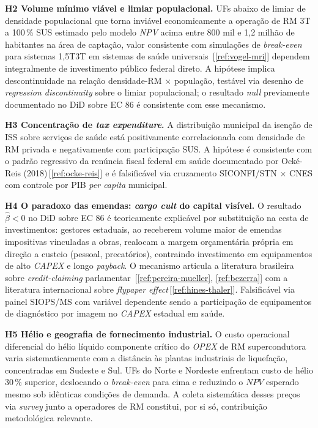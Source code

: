 \documentclass[12pt,a4paper,oneside]{article}
\begin{document}
\textbf{H2 \textemdash{} Volume mínimo viável e limiar
populacional.} UFs abaixo de limiar de densidade populacional que
torna inviável economicamente a operação de RM 3T a 100\,\% SUS
\textemdash{} estimado pelo modelo \textit{NPV} acima entre 800
mil e 1,2 milhão de habitantes na área de captação, valor
consistente com simulações de \textit{break-even} para sistemas
1,5T\textendash 3T em sistemas de saúde universais
\,[\ref{ref:vogel-mri}] \textemdash{} dependem integralmente de
investimento público federal direto. A hipótese implica
descontinuidade na relação densidade-RM $\times$ população,
testável via desenho de \textit{regression discontinuity} sobre
o limiar populacional; o resultado \textit{null} previamente
documentado no DiD sobre EC 86 é consistente com esse mecanismo.

\textbf{H3 \textemdash{} Concentração de \textit{tax expenditure}.}
A distribuição municipal da isenção de ISS sobre serviços de
saúde está positivamente correlacionada com densidade de RM
privada e negativamente com participação SUS. A hipótese é
consistente com o padrão regressivo da renúncia fiscal federal
em saúde documentado por Ocké-Reis (2018)\,[\ref{ref:ocke-reis}]
e é falsificável via cruzamento SICONFI/STN $\times$ CNES com
controle por PIB \textit{per capita} municipal.

\textbf{H4 \textemdash{} O paradoxo das emendas: \textit{cargo
cult} do capital visível.} O resultado $\hat\beta < 0$ no DiD
sobre EC 86 é teoricamente explicável por substituição na cesta
de investimentos: gestores estaduais, ao receberem volume maior
de emendas impositivas vinculadas a obras, realocam a margem
orçamentária própria em direção a custeio (pessoal, precatórios),
contraindo investimento em equipamentos de alto \textit{CAPEX} e
longo \textit{payback}. O mecanismo articula a literatura
brasileira sobre \textit{credit-claiming} parlamentar
\,[\ref{ref:pereira-mueller}, \ref{ref:bezerra}] com a literatura
internacional sobre \textit{flypaper effect}\,[\ref{ref:hines-thaler}].
Falsificável via painel SIOPS/MS com variável dependente sendo a
participação de equipamentos de diagnóstico por imagem no
\textit{CAPEX} estadual em saúde.

\textbf{H5 \textemdash{} Hélio e geografia de fornecimento
industrial.} O custo operacional diferencial do hélio líquido
\textemdash{} componente crítico do \textit{OPEX} de RM
supercondutora \textemdash{} varia sistematicamente com a
distância às plantas industriais de liquefação, concentradas em
Sudeste e Sul. UFs do Norte e Nordeste enfrentam custo de hélio
30\,\% superior, deslocando o \textit{break-even}
para cima e reduzindo o $\mathit{NPV}$ esperado mesmo sob idênticas
condições de demanda. A coleta sistemática desses preços via
\textit{survey} junto a operadores de RM constitui, por si só,
contribuição metodológica relevante.
\end{document}

